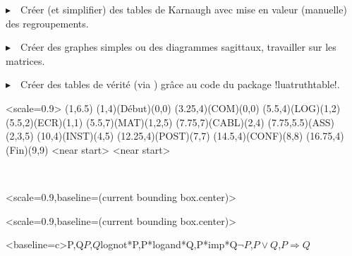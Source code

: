 \documentclass[french,a4paper,11pt]{article}
\begin{document}
\vspace{0.15cm}

{$\blacktriangleright$~~Créer (et simplifier) des tables de Karnaugh avec mise en valeur (manuelle) des regroupements.}

\vspace{0.15cm}

{$\blacktriangleright$~~Créer des graphes simples ou des diagrammes sagittaux, travailler sur les matrices.

\vspace{0.15cm}

{$\blacktriangleright$~~Créer des tables de vérité (via ) grâce au code du package \packagetex!luatruthtable!\footnotemark{}.

\vspace{1cm}

\hfill
\begin{GrapheMPM}[LargeurCases=0.5cm]<scale=0.9>
	\MPMPlaceNotice(1,6.5)
	\MPMPlaceTache(1,4)(Début)(0,0)
	\MPMPlaceTache(3.25,4)(COM)(0,0)
	\MPMPlaceTache(5.5,4)(LOG)(1,2)
	\MPMPlaceTache(5.5,2)(ECR)(1,1)
	\MPMPlaceTache(5.5,7)(MAT)(1,2{,}5)
	\MPMPlaceTache(7.75,7)(CABL)(2,4)
	\MPMPlaceTache(7.75,5.5)(ASS)(2,3{,}5)
	\MPMPlaceTache(10,4)(INST)(4,5)
	\MPMPlaceTache(12.25,4)(POST)(7,7)
	\MPMPlaceTache(14.5,4)(CONF)(8,8)
	\MPMPlaceTache(16.75,4)(Fin)(9,9)
	<near start>
	<near start>
\end{GrapheMPM}
\hfill~

\hfill
\begin{TableKarnaugh}<scale=0.9,baseline=(current bounding box.center)>
\end{TableKarnaugh}
\hspace{1cm}
\begin{TableKarnaugh}[Variables=u/v/w,Swap,CouleurCases=lime,PoliceTT]<scale=0.9,baseline=(current bounding box.center)>
\end{TableKarnaugh}
\hspace{1cm}
\TableVerite<baseline=c>{P,Q}{$P$,$Q$}{lognot*P,P*logand*Q,P*imp*Q}{$\lnot P$,$P \lor Q$,$P \Rightarrow Q$}
\hfill~

}}
\end{document}
